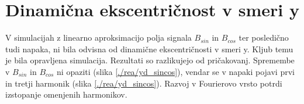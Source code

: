 \section{Dinamična ekscentričnost v smeri y}
V simulacijah z linearno aproksimacijo polja signala $B_{sin}$ in $B_{cos}$ ter posledično tudi napaka, ni bila odvisna od dinamične ekscentričnosti v smeri y. Kljub temu je bila opravljena simulacija. Rezultati so razlikujejo od pričakovanj. Spremembe v $B_{sin}$ in $B_{cos}$ ni opaziti (slika \ref{./rea/yd_sincos}), vendar se v napaki  pojavi prvi in tretji harmonik (slika \ref{./rea/yd_sincos}). Razvoj v Fourierovo vrsto potrdi izstopanje omenjenih harmonikov.
\newpage
